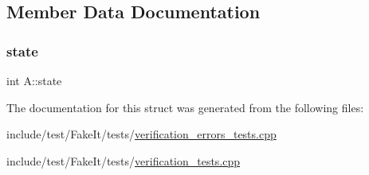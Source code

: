 \subsection{Member Data Documentation}
\mbox{\label{structA_a529f460ee223b18520cb7fa3740d6ebd}} 
\subsubsection{\texorpdfstring{state}{state}}
{\footnotesize\ttfamily int A\+::state}



The documentation for this struct was generated from the following files\+:\begin{DoxyCompactItemize}
\item 
include/test/\+Fake\+It/tests/\mbox{\hyperlink{verification__errors__tests_8cpp}{verification\+\_\+errors\+\_\+tests.\+cpp}}\item 
include/test/\+Fake\+It/tests/\mbox{\hyperlink{verification__tests_8cpp}{verification\+\_\+tests.\+cpp}}\end{DoxyCompactItemize}

